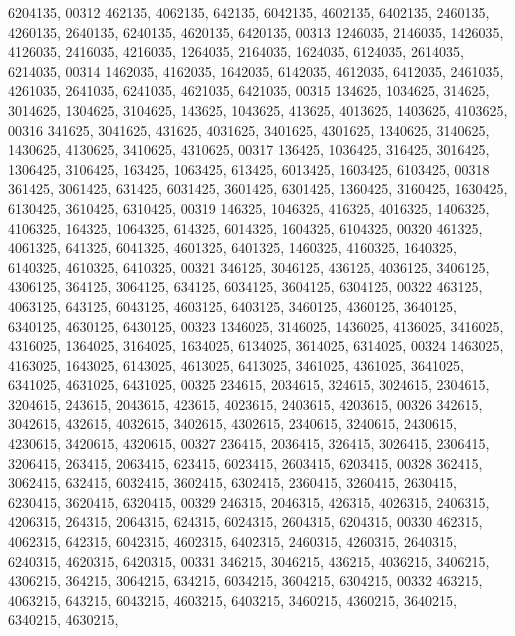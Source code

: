 \begin{DoxyCode}
      6204135,
00312        462135, 4062135,  642135, 6042135, 4602135, 6402135, 2460135, 4260135, 2640135, 6240135, 4620135, 
      6420135,
00313       1246035, 2146035, 1426035, 4126035, 2416035, 4216035, 1264035, 2164035, 1624035, 6124035, 2614035, 
      6214035,
00314       1462035, 4162035, 1642035, 6142035, 4612035, 6412035, 2461035, 4261035, 2641035, 6241035, 4621035, 
      6421035,
00315        134625, 1034625,  314625, 3014625, 1304625, 3104625,  143625, 1043625,  413625, 4013625, 1403625, 
      4103625,
00316        341625, 3041625,  431625, 4031625, 3401625, 4301625, 1340625, 3140625, 1430625, 4130625, 3410625, 
      4310625,
00317        136425, 1036425,  316425, 3016425, 1306425, 3106425,  163425, 1063425,  613425, 6013425, 1603425, 
      6103425,
00318        361425, 3061425,  631425, 6031425, 3601425, 6301425, 1360425, 3160425, 1630425, 6130425, 3610425, 
      6310425,
00319        146325, 1046325,  416325, 4016325, 1406325, 4106325,  164325, 1064325,  614325, 6014325, 1604325, 
      6104325,
00320        461325, 4061325,  641325, 6041325, 4601325, 6401325, 1460325, 4160325, 1640325, 6140325, 4610325, 
      6410325,
00321        346125, 3046125,  436125, 4036125, 3406125, 4306125,  364125, 3064125,  634125, 6034125, 3604125, 
      6304125,
00322        463125, 4063125,  643125, 6043125, 4603125, 6403125, 3460125, 4360125, 3640125, 6340125, 4630125, 
      6430125,
00323       1346025, 3146025, 1436025, 4136025, 3416025, 4316025, 1364025, 3164025, 1634025, 6134025, 3614025, 
      6314025,
00324       1463025, 4163025, 1643025, 6143025, 4613025, 6413025, 3461025, 4361025, 3641025, 6341025, 4631025, 
      6431025,
00325        234615, 2034615,  324615, 3024615, 2304615, 3204615,  243615, 2043615,  423615, 4023615, 2403615, 
      4203615,
00326        342615, 3042615,  432615, 4032615, 3402615, 4302615, 2340615, 3240615, 2430615, 4230615, 3420615, 
      4320615,
00327        236415, 2036415,  326415, 3026415, 2306415, 3206415,  263415, 2063415,  623415, 6023415, 2603415, 
      6203415,
00328        362415, 3062415,  632415, 6032415, 3602415, 6302415, 2360415, 3260415, 2630415, 6230415, 3620415, 
      6320415,
00329        246315, 2046315,  426315, 4026315, 2406315, 4206315,  264315, 2064315,  624315, 6024315, 2604315, 
      6204315,
00330        462315, 4062315,  642315, 6042315, 4602315, 6402315, 2460315, 4260315, 2640315, 6240315, 4620315, 
      6420315,
00331        346215, 3046215,  436215, 4036215, 3406215, 4306215,  364215, 3064215,  634215, 6034215, 3604215, 
      6304215,
00332        463215, 4063215,  643215, 6043215, 4603215, 6403215, 3460215, 4360215, 3640215, 6340215, 4630215, 

\end{DoxyCode}

